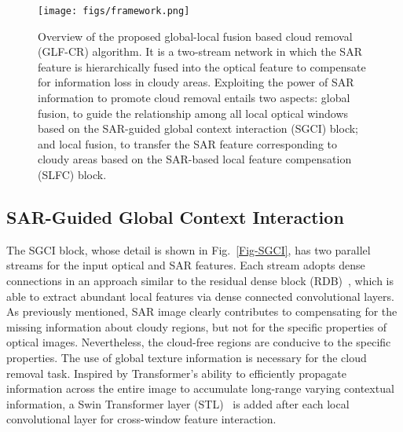 \documentclass[a4paper,fleqn]{cas-dc}
\begin{document}
\begin{figure*}[!t]
	\centering
	\texttt{[image: figs/framework.png]}
	\caption{Overview of the proposed global-local fusion based cloud removal (GLF-CR) algorithm. It is a two-stream network in which the SAR feature is hierarchically fused into the optical feature to compensate for information loss in cloudy areas. Exploiting the power of SAR information to promote cloud removal entails two aspects: global fusion, to guide the relationship among all local optical windows based on the SAR-guided global context interaction (SGCI) block; and local fusion, to transfer the SAR feature corresponding to cloudy areas based on the SAR-based local feature compensation (SLFC) block. }
	\label{overview}
	\vspace{-5mm}
\end{figure*}



\subsection{SAR-Guided Global Context Interaction}
\label{Sec-SGCI}
The SGCI block, whose detail is shown in Fig.~\ref{Fig-SGCI}, has two parallel streams for the input optical and SAR features. Each stream adopts dense connections in an approach similar to the residual dense block (RDB)~\citep{zhang2018residual}, which is able to extract abundant local features via dense connected convolutional layers. As previously mentioned, SAR image clearly contributes to compensating for the missing information about cloudy regions, but not for the specific properties of optical images. Nevertheless, the cloud-free regions are conducive to the specific properties. The use of global texture information is necessary for the cloud removal task. Inspired by Transformer's ability to efficiently propagate information across the entire image to accumulate long-range varying contextual information, 
a Swin Transformer layer (STL)~\citep{liu2021swin} is added after each local convolutional layer for cross-window feature interaction.
\end{document}
